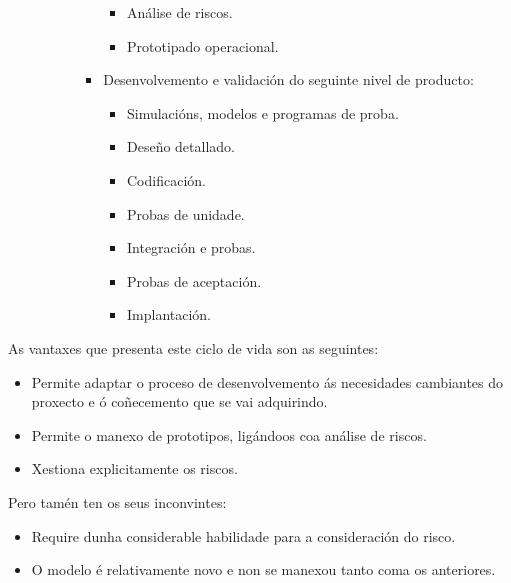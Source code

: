 \begin{itemize}
\begin{itemize}
\begin{enumerate}
\begin{itemize}
                            \begin{itemize}
                             \item Análise de riscos.
                             \item Prototipado operacional.
                            \end{itemize}
                      \item Desenvolvemento e validación do seguinte nivel de producto:
                            \begin{itemize}
                             \item Simulacións, modelos e programas de proba.
                             \item Deseño detallado.
                             \item Codificación.
                             \item Probas de unidade.
                             \item Integración e probas.
                             \item Probas de aceptación.
                             \item Implantación.
                            \end{itemize}
                     \end{itemize}
              \end{enumerate}
       \end{itemize}
\end{itemize}

As vantaxes que presenta este ciclo de vida son as seguintes:

\begin{itemize}
 \item Permite adaptar o proceso de desenvolvemento ás necesidades cambiantes
       do proxecto e ó coñecemento que se vai adquirindo.
 \item Permite o manexo de prototipos, ligándoos coa análise de riscos.
 \item Xestiona explicitamente os riscos.
\end{itemize}

Pero tamén ten os seus inconvintes:

\begin{itemize}
 \item Require dunha considerable habilidade para a consideración do risco.
 \item O modelo é relativamente novo e non se manexou tanto coma os anteriores.
\end{itemize}

